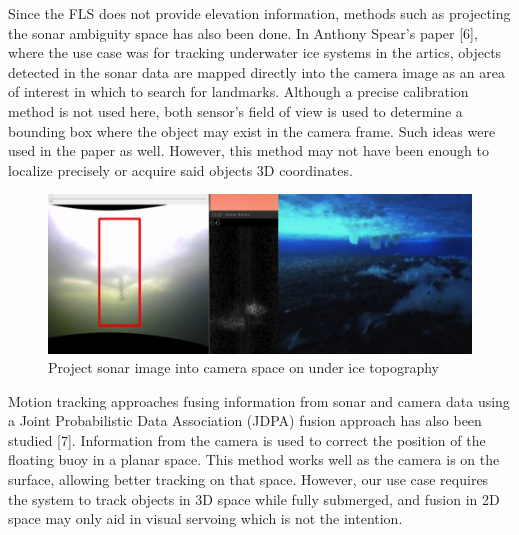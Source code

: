 \documentclass[a4paper]{IEEEtran}
\begin{document}
Since the FLS does not provide elevation information, methods such as projecting the sonar ambiguity space has also been done. In Anthony Spear’s paper [6], where the use case was for tracking underwater ice systems in the artics, objects detected in the sonar data are mapped directly into the camera image as an area of interest in which to search for landmarks. Although a precise calibration method is not used here, both sensor's field of view is used to determine a bounding box where the object may exist in the camera frame. Such ideas were used in the paper as well. However, this method may not have been enough to localize precisely or acquire said objects 3D coordinates.

\begin{figure}[h!]
  \centering
  \includegraphics[scale=0.5]{ice}
  \captionsetup{justification=centering}
  \caption{Project sonar image into camera space on under ice topography}
\end{figure}

Motion tracking approaches fusing information from sonar and camera data using a Joint Probabilistic Data Association (JDPA) fusion approach has also been studied [7]. Information from the camera is used to correct the position of the floating buoy in a planar space. This method works well as the camera is on the surface, allowing better tracking on that space. However, our use case requires the system to track objects in 3D space while fully submerged, and fusion in 2D space may only aid in visual servoing which is not the intention.
\end{document}
